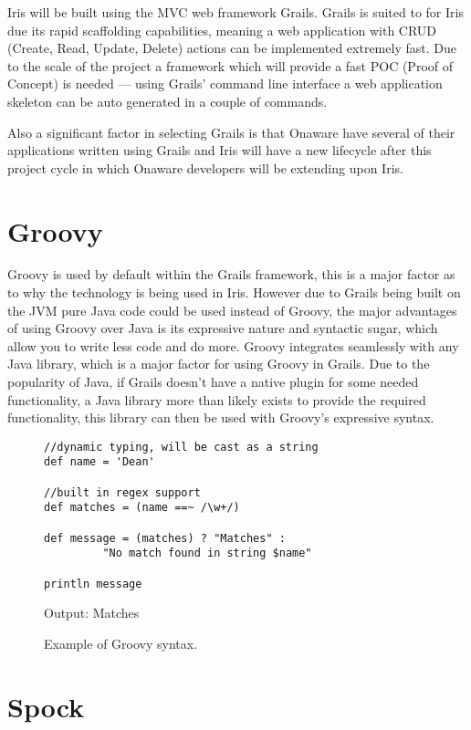 \documentclass[12pt,a4paper,titlepage]{report}
\begin{document}
Iris will be built using the MVC web framework Grails. Grails is suited to for Iris due its rapid scaffolding capabilities, meaning a web application with CRUD (Create, Read, Update, Delete) actions can be implemented extremely fast. Due to the scale of the project a framework which will provide a fast POC (Proof of Concept) is needed --- using Grails' command line interface a web application skeleton can be auto generated in a couple of commands. 

Also a significant factor in selecting Grails is that Onaware have several of their applications written using Grails and Iris will have a new lifecycle after this project cycle in which Onaware developers will be extending upon Iris. 

\section{Groovy}

Groovy is used by default within the Grails framework, this is a major factor as to why the technology is being used in Iris. However due to Grails being built on the JVM pure Java code could be used instead of Groovy, the major advantages of using Groovy over Java is its expressive nature and syntactic sugar, which allow you to write less code and do more. Groovy integrates seamlessly with any Java library, which is a major factor for using Groovy in Grails. Due to the popularity of Java, if Grails doesn't have a native plugin for some needed functionality, a Java library more than likely exists to provide the required functionality, this library can then be used with Groovy's expressive syntax.

\begin{figure}[H]
\begin{tcolorbox}
\begin{verbatim}
//dynamic typing, will be cast as a string
def name = 'Dean'

//built in regex support
def matches = (name ==~ /\w+/)   

def message = (matches) ? "Matches" :
		 "No match found in string $name"

println message
\end{verbatim}
Output:
Matches
\end{tcolorbox}
\caption{Example of Groovy syntax.}
\end{figure}

\section{Spock}
\end{document}
